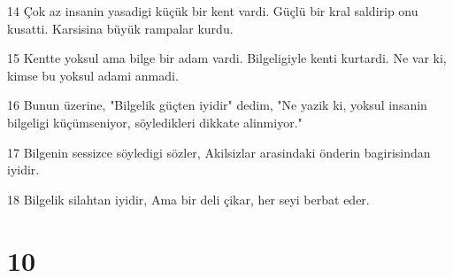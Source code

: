 \par 14 Çok az insanin yasadigi küçük bir kent vardi. Güçlü bir kral saldirip onu kusatti. Karsisina büyük rampalar kurdu.
\par 15 Kentte yoksul ama bilge bir adam vardi. Bilgeligiyle kenti kurtardi. Ne var ki, kimse bu yoksul adami anmadi.
\par 16 Bunun üzerine, "Bilgelik güçten iyidir" dedim, "Ne yazik ki, yoksul insanin bilgeligi küçümseniyor, söyledikleri dikkate alinmiyor."
\par 17 Bilgenin sessizce söyledigi sözler, Akilsizlar arasindaki önderin bagirisindan iyidir.
\par 18 Bilgelik silahtan iyidir, Ama bir deli çikar, her seyi berbat eder.

\chapter{10}

